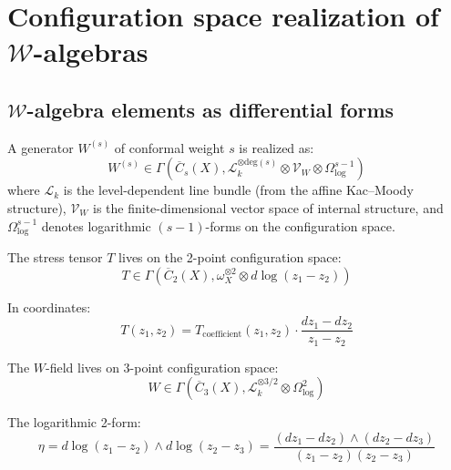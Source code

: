 \section{Configuration space realization of $\mathcal{W}$-algebras}

\subsection{$\mathcal{W}$-algebra elements as differential forms}

\begin{construction}
A generator $W^{(s)}$ of conformal weight $s$ is realized as:
\begin{equation}
W^{(s)} \in \Gamma\left(\overline{C}_s(X), \mathcal{L}_k^{\otimes \text{deg}(s)} \otimes \mathcal{V}_{W} \otimes \Omega^{s-1}_{\log}\right)
\end{equation}
where $\mathcal{L}_k$ is the level-dependent line bundle (from the affine Kac--Moody structure), $\mathcal{V}_W$ is the finite-dimensional vector space of internal structure, and $\Omega^{s-1}_{\log}$ denotes logarithmic $(s-1)$-forms on the configuration space.
\end{construction}

\begin{example}
The stress tensor $T$ lives on the 2-point configuration space:
\begin{equation}
T \in \Gamma(\overline{C}_2(X), \omega_X^{\otimes 2} \otimes d\log(z_1-z_2))
\end{equation}

In coordinates:
\begin{equation}
T(z_1, z_2) = T_{\text{coefficient}}(z_1, z_2) \cdot \frac{dz_1 - dz_2}{z_1 - z_2}
\end{equation}
\end{example}

\begin{example}
The $W$-field lives on 3-point configuration space:
\begin{equation}
W \in \Gamma(\overline{C}_3(X), \mathcal{L}_k^{\otimes 3/2} \otimes \Omega^2_{\log})
\end{equation}

The logarithmic 2-form:
\begin{equation}
\eta = d\log(z_1-z_2) \wedge d\log(z_2-z_3) = \frac{(dz_1-dz_2) \wedge (dz_2-dz_3)}{(z_1-z_2)(z_2-z_3)}
\end{equation}
\end{example}

